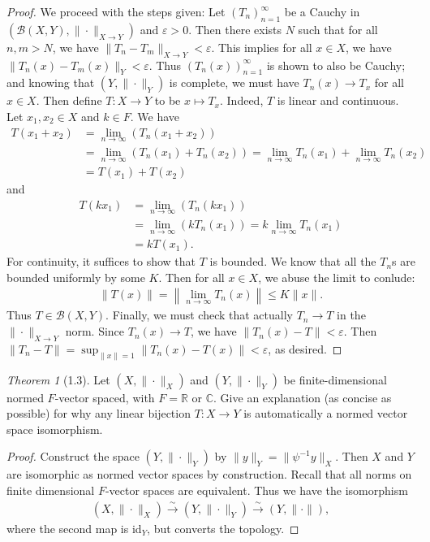 \documentclass[12pt]{article}
\theoremstyle{remark}
\theoremstyle{named}
\newtheorem*{theorem}{Theorem}
\newcommand{\e}{\varepsilon}
\newcommand{\R}{\mathbb R}
\newcommand{\C}{\mathbb C}
\begin{document}
\begin{proof}
    We proceed with the steps given:
    Let \((T_n)_{n = 1}^\infty\) be a Cauchy in \((\mathcal B (X, Y), \|\cdot\|_{X \to Y})\) and \(\e > 0\). Then there exists \(N\) such that for all \(n, m > N\), we have \(\|T_n - T_m\|_{X \to Y} < \e\). This implies for all \(x \in X\), we have \(\|T_n(x) - T_m(x)\|_{Y} < \e\). Thus \((T_n(x))_{n = 1}^\infty\) is shown to also be Cauchy; and knowing that \((Y, \|\cdot\|_Y)\) is complete, we must have \(T_n(x) \to T_x\) for all \(x \in X\). Then define \(T : X \to Y\) to be \(x \mapsto T_x\). 
    Indeed, \(T\) is linear and continuous. Let \(x_1, x_2 \in X\) and \(k \in F\). We have
    \begin{align*}
        T (x_1 + x_2) &= \lim_{n \to \infty} \left(T_n (x_1 + x_2)\right) \\ 
        &= \lim_{n \to \infty} (T_n(x_1) + T_n(x_2)) =  \lim_{n \to \infty} T_n(x_1) + \lim_{n \to \infty} T_n(x_2) \\
        &= T(x_1) + T(x_2)
    \end{align*}
    and
    \begin{align*}
        T (k x_1) &= \lim_{n \to \infty} \left(T_n (k x_1)\right) \\ 
        &= \lim_{n \to \infty} (k T_n(x_1)) = k \lim_{n \to \infty} T_n(x_1) \\
        &= k T(x_1).
    \end{align*}
    For continuity, it suffices to show that \(T\) is bounded. We know that all the \(T_n\)s are bounded uniformly by some \(K\). Then for all \(x \in X\), we abuse the limit to conlude:
    \begin{align*}
        \|T(x)\| = \left\|\lim_{n \to \infty} T_n (x)\right\| \leq K \|x\|.
    \end{align*}
    Thus \(T \in \mathcal B(X, Y)\). Finally, we must check that actually \(T_n \to T\) in the \(\|\cdot\|_{X \to Y}\) norm. Since \(T_n(x) \to T\), we have \(\|T_n(x) - T\| < \e\). Then \(\|T_n - T\| = \sup_{\|x\| = 1} \|T_n(x) - T(x)\| < \e\), as desired.
\end{proof}
\newpage
\begin{theorem}[1.3]
    Let \((X, \|\cdot\|_X)\) and \((Y, \|\cdot\|_Y)\) be finite-dimensional normed \(F\)-vector spaced, with \(F = \R\) or \(\C\). Give an explanation (as concise as possible) for why any linear bijection \(T : X \to Y\) is automatically a normed vector space isomorphism.
\end{theorem}

\begin{proof}
    Construct the space \((Y, \|\cdot\|_Y)\) by \(\|y\|_Y = \|\psi^{-1}y\|_X\). Then \(X\) and \(Y\) are isomorphic as normed vector spaces by construction. Recall that all norms on finite dimensional \(F\)-vector spaces are equivalent. Thus we have the isomorphism
    \begin{align*}
        (X, \|\cdot\|_X) \xrightarrow{\sim} (Y, \|\cdot\|_Y) \xrightarrow{\sim} (Y, \|\cdot\|),
    \end{align*}
    where the second map is id\(_Y\), but converts the topology.
\end{proof}
\end{document}
